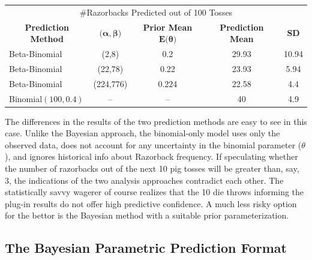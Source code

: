\documentclass[12pt, a4paper]{article}
\begin{document}
\vspace{2cm}


\vspace{1cm}

\begin{center}
  \begin{tabular}{l c c c c }
  \toprule
  \multicolumn{5}{c}{\large \#Razorbacks Predicted out of 100 Tosses}          \\
  \multicolumn{1}{c}{\textbf{Prediction Method}} & \multicolumn{1}{c}{$\textbf{(}\boldsymbol\alpha,\boldsymbol\beta\textbf{)}$}  & \multicolumn{1}{c}{\textbf{Prior Mean }$\textbf{E(}\boldsymbol\theta\textbf{)}$}  & \multicolumn{1}{c}{\textbf{Prediction Mean}} & \multicolumn{1}{c}{\textbf{SD}}\\
        \midrule
        Beta-Binomial & (2,8) & 0.2 & 29.93 & 10.94 \\
        \midrule
        Beta-Binomial & (22,78) & 0.22 & 23.93 & 5.94\\
        \midrule
        Beta-Binomial & (224,776) & 0.224 & 22.58 & 4.4 \\
        \midrule
        Binomial$(100,0.4)$ & -- & -- & 40 & 4.9 \\
  \bottomrule
  \end{tabular}
\end{center}

\vspace{1cm}

\noindent The differences in the results of the two prediction methods are easy to see in this case. Unlike the Bayesian approach, the binomial-only model uses only the observed data, does not account for any uncertainty in the binomial parameter ($\theta$), and ignores historical info about Razorback frequency.  If speculating whether the number of razorbacks out of the next 10 pig tosses will be greater than, say, 3, the indications of the two analysis approaches contradict each other.  The statistically savvy wagerer of course realizes that the 10 die throws informing the plug-in results do not offer high predictive confidence.  A much less risky option for the bettor is the Bayesian method with a suitable prior parameterization.


\clearpage

  \subsection{The Bayesian Parametric Prediction Format}
\end{document}

